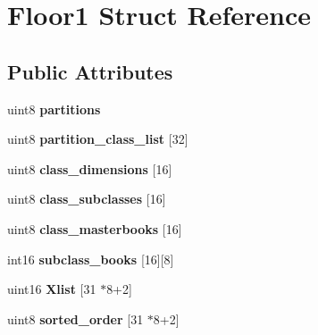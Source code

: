 \hypertarget{structFloor1}{\section{Floor1 Struct Reference}
\label{structFloor1}
}
\subsection*{Public Attributes}
\begin{DoxyCompactItemize}
\item 
\hypertarget{structFloor1_a4dee145bcd73bc21fee38a83ef91a056}{uint8 {\bfseries partitions}}\label{structFloor1_a4dee145bcd73bc21fee38a83ef91a056}

\item 
\hypertarget{structFloor1_af59d85fae4137a1926954355056f24dc}{uint8 {\bfseries partition\-\_\-class\-\_\-list} \mbox{[}32\mbox{]}}\label{structFloor1_af59d85fae4137a1926954355056f24dc}

\item 
\hypertarget{structFloor1_ab7adeb3e2d518eddd510c525e14c0421}{uint8 {\bfseries class\-\_\-dimensions} \mbox{[}16\mbox{]}}\label{structFloor1_ab7adeb3e2d518eddd510c525e14c0421}

\item 
\hypertarget{structFloor1_af3004149b67bcab60a25afb51ea07f87}{uint8 {\bfseries class\-\_\-subclasses} \mbox{[}16\mbox{]}}\label{structFloor1_af3004149b67bcab60a25afb51ea07f87}

\item 
\hypertarget{structFloor1_ad10936c904d13820156191fcc25c7b07}{uint8 {\bfseries class\-\_\-masterbooks} \mbox{[}16\mbox{]}}\label{structFloor1_ad10936c904d13820156191fcc25c7b07}

\item 
\hypertarget{structFloor1_af51fdc5e2e82b6357285e2d302b35230}{int16 {\bfseries subclass\-\_\-books} \mbox{[}16\mbox{]}\mbox{[}8\mbox{]}}\label{structFloor1_af51fdc5e2e82b6357285e2d302b35230}

\item 
\hypertarget{structFloor1_a2c09f98b7613ec990add2467ea39f240}{uint16 {\bfseries Xlist} \mbox{[}31 $\ast$8+2\mbox{]}}\label{structFloor1_a2c09f98b7613ec990add2467ea39f240}

\item 
\hypertarget{structFloor1_a7e6efe1155cfafd2eeb2cdcc39f121a1}{uint8 {\bfseries sorted\-\_\-order} \mbox{[}31 $\ast$8+2\mbox{]}}\label{structFloor1_a7e6efe1155cfafd2eeb2cdcc39f121a1}


\end{DoxyCompactItemize}

